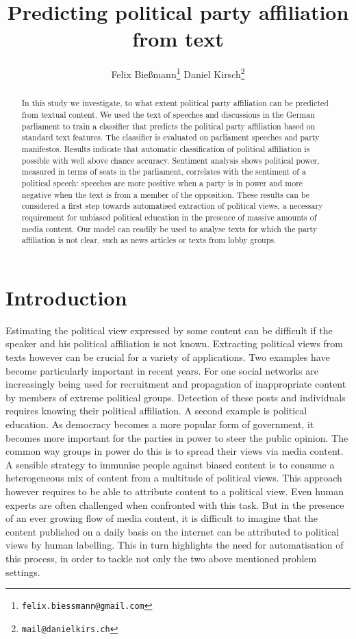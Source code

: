 \documentclass{article} %
\title{Predicting political party affiliation from text}
\author{
Felix Bie\ss{}mann\thanks{\texttt{felix.biessmann@gmail.com}}
\And
Daniel Kirsch\thanks{\texttt{mail@danielkirs.ch}}
}
\begin{document}
\maketitle

\begin{abstract}
In this study we investigate, to what extent political party affiliation can be predicted from textual content. We used the text of speeches and discussions in the German parliament to train a classifier that predicts the political party affiliation based on standard text features. The classifier is evaluated on parliament speeches and party manifestos. Results indicate that automatic classification of political affiliation is possible with well above chance accuracy. Sentiment analysis shows political power, measured in terms of seats in the parliament, correlates with the sentiment of a political speech: speeches are more positive when a party is in power and more negative when the text is from a member of the opposition. These results can be considered a first step towards automatised extraction of political views, a necessary requirement for unbiased political education in the presence of massive amounts of media content. Our model can readily be used to analyse texts for which the party affiliation is not clear, such as news articles or texts from lobby groups. 
\end{abstract}

\section{Introduction}

Estimating the political view expressed by some content can be difficult if the speaker and his political affiliation is not known. Extracting political views from texts however can be crucial for a variety of applications. Two examples have become particularly important in recent years. 
For one social networks are increasingly being used for recruitment and propagation of inappropriate content by members of extreme political groups. Detection of these posts and individuals requires knowing their political affiliation. A second example is political education. As democracy becomes a more popular form of government, it becomes more important for the parties in power to steer the public opinion. The common way groups in power do this is to spread their views via media content. A sensible strategy to immunise people against biased content is to consume a heterogeneous mix of content from a multitude of political views. This approach however requires to be able to attribute content to a political view. 
Even human experts are often challenged when confronted with this task. But in the presence of an ever growing flow of media content, it is difficult to imagine that the content published on a daily basis on the internet can be attributed to political views by human labelling. This in turn highlights the need for automatisation of this process, in order to tackle not only the two above mentioned problem settings.
\end{document}
